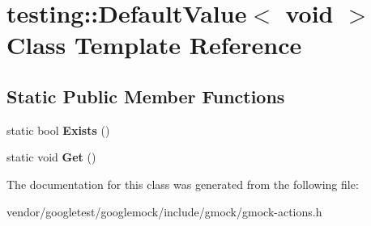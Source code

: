 \hypertarget{classtesting_1_1DefaultValue_3_01void_01_4}{}\section{testing\+:\+:Default\+Value$<$ void $>$ Class Template Reference}
\label{classtesting_1_1DefaultValue_3_01void_01_4}
\subsection*{Static Public Member Functions}
\begin{DoxyCompactItemize}
\item 
static bool {\bfseries Exists} ()\hypertarget{classtesting_1_1DefaultValue_3_01void_01_4_ae18ea46cbf928b820c91f15fa7aa317b}{}\label{classtesting_1_1DefaultValue_3_01void_01_4_ae18ea46cbf928b820c91f15fa7aa317b}

\item 
static void {\bfseries Get} ()\hypertarget{classtesting_1_1DefaultValue_3_01void_01_4_acda4c367a5b0c0cfb28bc2289f385eed}{}\label{classtesting_1_1DefaultValue_3_01void_01_4_acda4c367a5b0c0cfb28bc2289f385eed}

\end{DoxyCompactItemize}


The documentation for this class was generated from the following file\+:\begin{DoxyCompactItemize}
\item 
vendor/googletest/googlemock/include/gmock/gmock-\/actions.\+h\end{DoxyCompactItemize}
